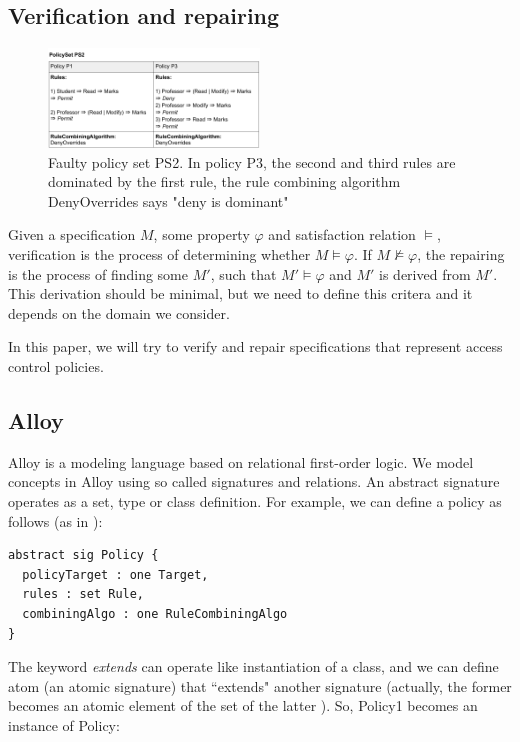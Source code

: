 \documentclass{acm_proc_article-sp}
\begin{document}
\subsection{Verification and repairing}

\begin{figure}[h]
\includegraphics[width=0.5\textwidth]{policyset_faulty.png}
\caption{Faulty policy set PS2. In policy P3, the second and third rules are dominated by the first rule, the rule combining algorithm DenyOverrides says "deny is dominant"}    
  \label{fig:policysetfaulty}
\end{figure}

Given a specification $M$, some property $\varphi$ and satisfaction relation $\models$, verification is the process of determining whether $M\models\varphi$. If $M\not\models\varphi$, the repairing is the process of finding some $M'$, such that $M'\models\varphi$ and $M'$ is derived from $M'$. This derivation should be minimal, but we need to define this critera and it depends on the domain we consider.

In this paper, we will try to verify and repair specifications that represent access control policies.

\subsection{Alloy}
Alloy \cite{jackson:alloy} is a modeling language based on relational first-order logic. We model concepts in Alloy using so called signatures and relations. An abstract signature operates as a set, type or class definition. For example, we can define a policy as follows (as in \cite{acp:alloy}):
 
 \begin{verbatim}
abstract sig Policy {
  policyTarget : one Target,
  rules : set Rule,
  combiningAlgo : one RuleCombiningAlgo
} 
\end{verbatim}

The keyword \textit{extends} can operate like instantiation of a class, and we can define atom (an atomic signature) that ``extends" another signature (actually, the former becomes an atomic element of the set of the latter \cite{jackson:alloy}). So, Policy1 becomes an instance of Policy:
\end{document}
